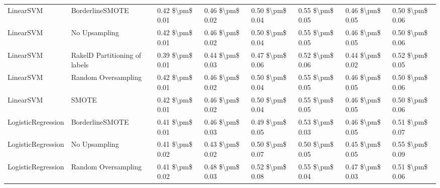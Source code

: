 \begin{tabular}{llllllll}
                      LinearSVM &               BorderlineSMOTE & 0.42 \$\textbackslash pm\$ 0.01 &           0.46 \$\textbackslash pm\$ 0.02 &       0.50 \$\textbackslash pm\$ 0.04 &        0.55 \$\textbackslash pm\$ 0.05 &                         0.46 \$\textbackslash pm\$ 0.05 &     0.50 \$\textbackslash pm\$ 0.06 \\
                      LinearSVM &                 No Upsampling & 0.42 \$\textbackslash pm\$ 0.01 &           0.46 \$\textbackslash pm\$ 0.02 &       0.50 \$\textbackslash pm\$ 0.04 &        0.55 \$\textbackslash pm\$ 0.05 &                         0.46 \$\textbackslash pm\$ 0.05 &     0.50 \$\textbackslash pm\$ 0.06 \\
                      LinearSVM & RakelD Partitioning of labels & 0.39 \$\textbackslash pm\$ 0.01 &           0.44 \$\textbackslash pm\$ 0.03 &       0.47 \$\textbackslash pm\$ 0.06 &        0.52 \$\textbackslash pm\$ 0.06 &                         0.44 \$\textbackslash pm\$ 0.02 &     0.52 \$\textbackslash pm\$ 0.05 \\
                      LinearSVM &           Random Oversampling & 0.42 \$\textbackslash pm\$ 0.01 &           0.46 \$\textbackslash pm\$ 0.02 &       0.50 \$\textbackslash pm\$ 0.04 &        0.55 \$\textbackslash pm\$ 0.05 &                         0.46 \$\textbackslash pm\$ 0.05 &     0.50 \$\textbackslash pm\$ 0.06 \\
                      LinearSVM &                         SMOTE & 0.42 \$\textbackslash pm\$ 0.01 &           0.46 \$\textbackslash pm\$ 0.02 &       0.50 \$\textbackslash pm\$ 0.04 &        0.55 \$\textbackslash pm\$ 0.05 &                         0.46 \$\textbackslash pm\$ 0.05 &     0.50 \$\textbackslash pm\$ 0.06 \\
             LogisticRegression &               BorderlineSMOTE & 0.41 \$\textbackslash pm\$ 0.01 &           0.46 \$\textbackslash pm\$ 0.03 &       0.49 \$\textbackslash pm\$ 0.05 &        0.53 \$\textbackslash pm\$ 0.03 &                         0.46 \$\textbackslash pm\$ 0.05 &     0.51 \$\textbackslash pm\$ 0.07 \\
             LogisticRegression &                 No Upsampling & 0.41 \$\textbackslash pm\$ 0.02 &           0.43 \$\textbackslash pm\$ 0.02 &       0.50 \$\textbackslash pm\$ 0.07 &        0.50 \$\textbackslash pm\$ 0.05 &                         0.45 \$\textbackslash pm\$ 0.05 &     0.55 \$\textbackslash pm\$ 0.09 \\
             LogisticRegression &           Random Oversampling & 0.41 \$\textbackslash pm\$ 0.02 &           0.48 \$\textbackslash pm\$ 0.03 &       0.52 \$\textbackslash pm\$ 0.08 &        0.55 \$\textbackslash pm\$ 0.04 &                         0.47 \$\textbackslash pm\$ 0.03 &     0.51 \$\textbackslash pm\$ 0.06 \\

\end{tabular}
